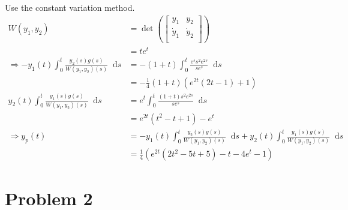 \documentclass[utf8]{ctexart}
\newcommand{\dif}{\mathop{}\!\mathrm{d}}
\begin{document}
Use the constant variation method.
\begin{equation}
	\begin{aligned}
		W(y_1,y_2)                                                            & =\det\left(\begin{bmatrix}
			                                                                                   y_1       & y_2       \\
			                                                                                   \dot{y}_1 & \dot{y}_2 \\
		                                                                                   \end{bmatrix}\right)                                                                 \\
		                                                                      & =te^{t}                                                                                                             \\
		\Rightarrow -y_1(t)\int_{0}^{t}\frac{y_2(s)g(s)}{W(y_1,y_2)(s)}\dif s & =-(1+t)\int_{0}^{t}\frac{e^{s}s^{2}e^{2s}}{se^{s}}\dif s                                                            \\
		                                                                      & =-\frac{1}{4}(1+t)(e^{2 t} (2 t-1)+1)                                                                               \\
		y_2(t)\int_{0}^{t}\frac{y_1(s)g(s)}{W(y_1,y_2)(s)}\dif s              & =e^{t}\int_{0}^{t}\frac{(1+t)s^{2}e^{2s}}{se^{s}}\dif s                                                             \\
		                                                                      & =e^{2 t} \left(t^2-t+1\right)-e^t                                                                                   \\
		\Rightarrow y_{p}(t)                                                  & =-y_1(t)\int_{0}^{t}\frac{y_2(s)g(s)}{W(y_1,y_2)(s)}\dif s+y_2(t)\int_{0}^{t}\frac{y_1(s)g(s)}{W(y_1,y_2)(s)}\dif s \\
		                                                                      & =\frac{1}{4} \left(e^{2 t} \left(2 t^2-5 t+5\right)-t-4 e^t-1\right)
	\end{aligned}
\end{equation}

\section{Problem 2}
\end{document}
